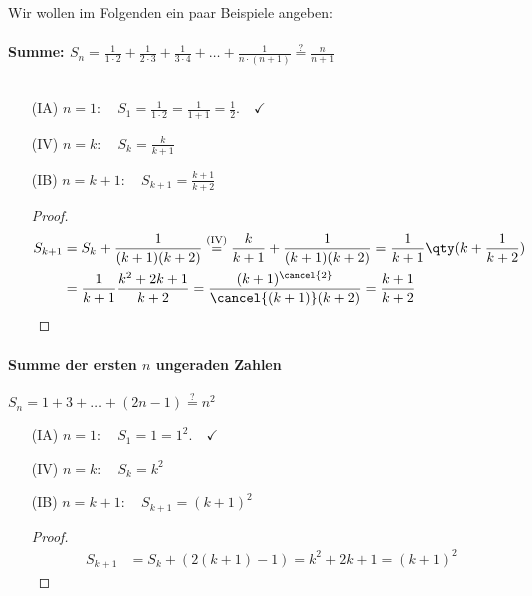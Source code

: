 Wir wollen im Folgenden ein paar Beispiele angeben:

\paragraph{Summe: $\displaystyle S_n = \frac{1}{1\cdot 2} + \frac{1}{2\cdot 3}+ \frac{1}{3\cdot 4} + \hdots + \frac{1}{n\cdot (n+1)} \overset{?}{=} \frac{n}{n+1}$}$~$

\begin{enumerate}
    \item[(IA)] $\displaystyle n=1: \quad S_1 = \frac{1}{1\cdot 2} = \frac{1}{1+1} = \frac{1}{2} .\quad\checkmark$ 
    \item[(IV)] $\displaystyle n=k: \quad S_k = \frac{k}{k+1}$
    \item[(IB)] $\displaystyle n=k+1:\quad S_{k+1} = \frac{k+1}{k+2}$
    \begin{proof}$~$\\[-1.5cm]
        \begin{align}
            S_{k+1} &= S_k + \frac{1}{(k+1)(k+2)} \overset{(\text{IV})}{=} \frac{k}{k+1} + \frac{1}{(k+1)(k+2)} = \frac{1}{k+1} \qty(k+\frac{1}{k+2}) \notag \\
            &= \frac{1}{k+1} \frac{k^2+2k+1}{k+2} = \frac{(k+1)^{\cancel{2}}}{\cancel{(k+1)}(k+2)} = \frac{k+1}{k+2}
        \end{align}
    \end{proof}
\end{enumerate}

\paragraph{Summe der ersten $n$ ungeraden Zahlen} $S_n = 1 +3 + \hdots + (2n-1) \overset{?}{=} n^2$

\begin{enumerate}
    \item[(IA)] $\displaystyle n=1: \quad S_1 = 1 = 1^2 .\quad\checkmark$ 
    \item[(IV)] $\displaystyle n=k: \quad S_k = k^2$
    \item[(IB)] $\displaystyle n=k+1:\quad S_{k+1} = (k+1)^2$
    \begin{proof}$~$\\[-1.5cm]
        \begin{align}
            S_{k+1} &= S_k + (2(k+1)-1) = k^2 + 2k +1 = (k+1)^2
        \end{align}
    \end{proof}
\end{enumerate}

